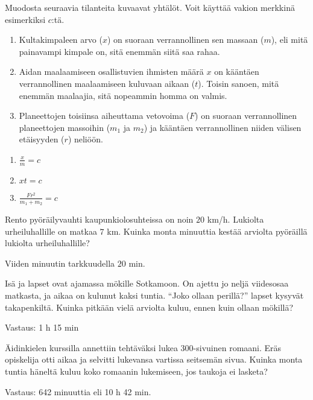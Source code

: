 \begin{tehtava}
Muodosta seuraavia tilanteita kuvaavat yhtälöt. Voit käyttää vakion
merkkinä esimerkiksi $c$:tä.
\begin{enumerate}
\item Kultakimpaleen arvo ($x$) on suoraan verrannollinen sen massaan ($m$),
eli mitä painavampi kimpale on, sitä enemmän siitä saa rahaa.
\item Aidan maalaamiseen osallistuvien ihmisten määrä {$x$} on kääntäen verrannollinen maalaamiseen kuluvaan aikaan ($t$). Toisin sanoen, mitä
enemmän maalaajia, sitä nopeammin homma on valmis.
\item Planeettojen toisiinsa aiheuttama vetovoima ($F$) on suoraan verrannollinen planeettojen massoihin ($m_1$ ja $m_2$) ja kääntäen verrannollinen niiden välisen etäisyyden ($r$) neliöön.
\end{enumerate}
\begin{vastaus}
\begin{enumerate}
\item $ \frac{x}{m}=c$
\item $ xt=c $
\item $ \frac{Fr^2}{m_1+m_2}=c$
\end{enumerate}
\end{vastaus}
\end{tehtava}

\begin{tehtava}
Rento pyöräilyvauhti kaupunkiolosuhteissa on noin $20$ km/h. Lukiolta urheiluhallille on matkaa $7$ km. Kuinka monta minuuttia kestää arviolta pyöräillä lukiolta urheiluhallille?
\begin{vastaus}
Viiden minuutin tarkkuudella $20$ min.
\end{vastaus}
\end{tehtava}

\begin{tehtava}
    Isä ja lapset ovat ajamassa mökille Sotkamoon. On ajettu jo neljä
    viidesosaa matkasta, ja aikaa on kulunut kaksi tuntia. ``Joko ollaan perillä?''
    lapset kysyvät takapenkiltä. Kuinka pitkään vielä arviolta kuluu, ennen
    kuin ollaan mökillä?
    
    \begin{vastaus}
        Vastaus: 1 h 15 min
    \end{vastaus}
\end{tehtava}

\begin{tehtava}
    Äidinkielen kurssilla annettiin tehtäväksi lukea 300-sivuinen romaani.
    Eräs opiskelija otti aikaa ja selvitti lukevansa vartissa seitsemän sivua.
    Kuinka monta tuntia häneltä kuluu koko romaanin lukemiseen, jos
    taukoja ei lasketa?
    
    \begin{vastaus}
        Vastaus: 642 minuuttia eli 10 h 42 min.
    \end{vastaus}
\end{tehtava}
